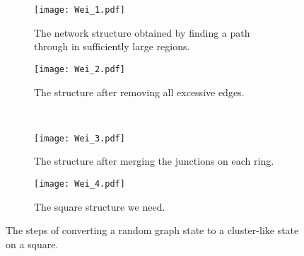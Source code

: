 \documentclass[aps,amsfonts,pra,twocolumn,showpacs]{revtex4-1}
\begin{document}
\begin{figure}[h]
		\begin{subfigure}[t]{0.22\textwidth}
			\centering
			\texttt{[image: Wei\_1.pdf]}
			\caption{The network structure obtained by finding a path through in sufficiently large regions.}
			\label{Wei_1}
		\end{subfigure}
		\hspace{1mm}
		\begin{subfigure}[t]{0.22\textwidth}
			\centering
			\texttt{[image: Wei\_2.pdf]}
			\caption{The structure after removing all excessive edges.}
			\label{Wei_2}
		\end{subfigure} \\
		\vspace{1mm}
		\begin{subfigure}[t]{0.22\textwidth}
			\centering
			\texttt{[image: Wei\_3.pdf]}
			\caption{The structure after merging the junctions on each ring.}
			\label{Wei_3}
		\end{subfigure}
		\hspace{1mm}
		\begin{subfigure}[t]{0.22\textwidth}
			\centering
			\texttt{[image: Wei\_4.pdf]}
			\caption{The square structure we need.}
			\label{Wei_4}
		\end{subfigure}
		\caption{The steps of converting a random graph state to a cluster-like state on a square.}
		\label{Wei}
	\end{figure}
	
\end{document}

